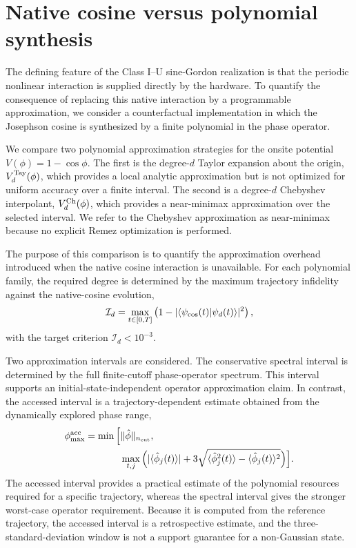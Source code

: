 \documentclass[pra,twocolumn,superscriptaddress,nofootinbib,floatfix]{revtex4-2}
\theoremstyle{remark}
\newcommand{\revcolor}{\color{blue}}
\DeclareRobustCommand{\rev}[1]{{\revcolor #1}}
\begin{document}
\section{Native cosine versus polynomial synthesis}
\label{app:sg-poly}
\label{subsec:sg-poly}

\rev{The defining feature of the Class I--U sine-Gordon realization is that the periodic nonlinear interaction is supplied directly by the hardware.} To quantify the consequence of replacing this native interaction by a programmable approximation, we consider a counterfactual implementation in which the Josephson cosine is synthesized by a finite polynomial in the phase operator.

We compare two polynomial approximation strategies for the onsite potential \(V(\phi)=1-\cos\phi .\) The first is the degree-\(d\) Taylor expansion about the origin, \(V_d^{\rm Tay}(\phi)\), which provides a local analytic approximation but is not optimized for uniform accuracy over a finite interval. The second is a degree-\(d\) Chebyshev interpolant, \(V_d^{\rm Ch}(\phi)\), which provides a near-minimax approximation over the selected interval. We refer to the Chebyshev approximation as near-minimax because no explicit Remez optimization is performed.

The purpose of this comparison is to quantify the approximation overhead introduced when the native cosine interaction is unavailable. For each polynomial family, the required degree is determined by the maximum trajectory infidelity against the native-cosine evolution,
\[
\mathcal I_d=\max_{t\in[0,T]}\left(1-|\langle\psi_{\rm cos}(t)|\psi_d(t)\rangle|^2\right),
\]
with the target criterion \(\mathcal I_d<10^{-3}.\)

Two approximation intervals are considered. The conservative spectral interval is determined by the full finite-cutoff phase-operator spectrum. This interval supports an initial-state-independent operator approximation claim. In contrast, the accessed interval is a trajectory-dependent estimate obtained from the dynamically explored phase range,
\begin{align}
\phi_{\max}^{\rm acc}=\min\Big[&\|\hat\phi\|_{n_{\rm cut}},\nonumber\\
&\max_{t,j}\Big(|\langle\hat\phi_j(t)\rangle|+3\sqrt{\langle\hat\phi_j^2(t)\rangle-\langle\hat\phi_j(t)\rangle^2}\Big)\Big].
\end{align}
The accessed interval provides a practical estimate of the polynomial resources required for a specific trajectory, whereas the spectral interval gives the stronger worst-case operator requirement. \rev{Because it is computed from the reference trajectory, the accessed interval is a retrospective estimate, and the three-standard-deviation window is not a support guarantee for a non-Gaussian state.}
\end{document}
